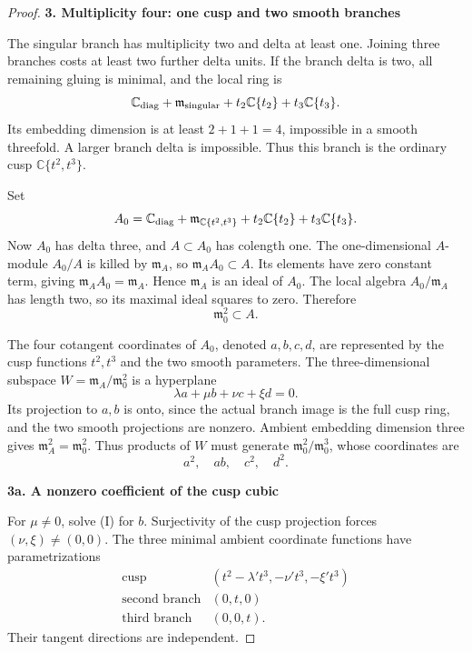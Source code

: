 \begin{proof}
\par\medskip\noindent\textbf{3. Multiplicity four: one cusp and two smooth branches}\par\label{multiplicity-four-one-cusp-and-two-smooth-branches}

The singular branch has multiplicity two and delta at least one. Joining three branches costs at least two further delta units. If the branch delta is two, all remaining gluing is minimal, and the local ring is \[
 \mathbb C_{\rm diag}
 +\mathfrak m_{\rm singular}
 +t_2\mathbb C\{t_2\}+t_3\mathbb C\{t_3\}.
\] Its embedding dimension is at least \(2+1+1=4\), impossible in a smooth threefold. A larger branch delta is impossible. Thus this branch is the ordinary cusp \(\mathbb C\{t^2,t^3\}\).

Set \[
 A_0=\mathbb C_{\rm diag}
 +\mathfrak m_{\mathbb C\{t^2,t^3\}}
 +t_2\mathbb C\{t_2\}+t_3\mathbb C\{t_3\}.
\] Now \(A_0\) has delta three, and \(A\subset A_0\) has colength one. The one-dimensional \(A\)-module \(A_0/A\) is killed by \(\mathfrak m_A\), so \(\mathfrak m_AA_0\subset A\). Its elements have zero constant term, giving \(\mathfrak m_AA_0=\mathfrak m_A\). Hence \(\mathfrak m_A\) is an ideal of \(A_0\). The local algebra \(A_0/\mathfrak m_A\) has length two, so its maximal ideal squares to zero. Therefore \[
                         \mathfrak m_0^2\subset A.     \tag{H}
\]

The four cotangent coordinates of \(A_0\), denoted \(a,b,c,d\), are represented by the cusp functions \(t^2,t^3\) and the two smooth parameters. The three-dimensional subspace \(W=\mathfrak m_A/\mathfrak m_0^2\) is a hyperplane \[
                 \lambda a+\mu b+\nu c+\xi d=0.       \tag{I}
\] Its projection to \(a,b\) is onto, since the actual branch image is the full cusp ring, and the two smooth projections are nonzero. Ambient embedding dimension three gives \(\mathfrak m_A^2=\mathfrak m_0^2\). Thus products of \(W\) must generate \(\mathfrak m_0^2/\mathfrak m_0^3\), whose coordinates are \[
                              a^2,\quad ab,\quad c^2,\quad d^2.
                                                               \tag{J}
\]

\par\medskip\noindent\textbf{3a. A nonzero coefficient of the cusp cubic}\par\label{a.-a-nonzero-coefficient-of-the-cusp-cubic}

For \(\mu\ne0\), solve (I) for \(b\). Surjectivity of the cusp projection forces \((\nu,\xi)\ne(0,0)\). The three minimal ambient coordinate functions have parametrizations \[
 \begin{array}{c|c}
 \text{cusp}&(t^2-\lambda't^3,-\nu't^3,-\xi't^3)\\
 \text{second branch}&(0,t,0)\\
 \text{third branch}&(0,0,t).
 \end{array}
\] Their tangent directions are independent.


\end{proof}
